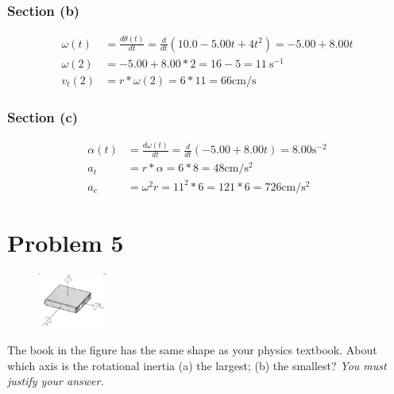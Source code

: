 \documentclass[12pt]{article}
\begin{document}
\subsubsection*{Section (b)}
\begin{align*}
    \omega(t)   &=  \frac{d\theta(t)}{dt}
        =   \frac{d}{dt}\left(10.0 - 5.00 t + 4 t^2\right)
        =   -5.00 + 8.00 t\\
    \omega(2)   &=  -5.00 + 8.00 * 2
        =   16 - 5
        =   11\ \unit{\second^{-1}}\\
    v_t(2)  &=  r*\omega(2)
        =   6*11
        =   \boxed{66\unit{\centi\meter/\second}}
\end{align*}

\subsubsection*{Section (c)}
\begin{align*}
    \alpha(t)   &=  \frac{d\omega(t)}{dt}
        =   \frac{d}{dt}\left(-5.00 + 8.00 t\right)
        =   8.00    \unit{\second^{-2}}\\
    a_t &=  r*\alpha
        =   6*8
        =   \boxed{48\unit{\centi\meter/\second^2}}\\
    a_c &=  \omega^2 r
        =   11^2*6
        =   121*6
        =   \boxed{726\unit{\centi\meter/\second^2}}
\end{align*}


\pagebreak
\section*{Problem 5}
\begin{figure}
    \vspace{-30pt}
    \includegraphics[width=0.20\textwidth]{graph_5.png} 
\end{figure}
The book in the figure has the same shape as your physics textbook. About which axis is the
rotational inertia (a) the largest; (b) the smallest? \textit{You must justify your answer.}
\end{document}
